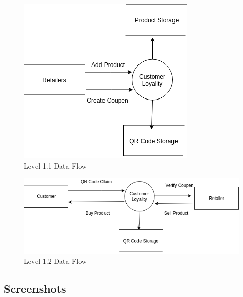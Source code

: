 \hspace{2.0mm}
\begin{figure}[H]
\includegraphics[scale=0.63]{level1_1}
\caption{Level 1.1 Data Flow}
\end{figure}
\vspace{2cm}
\begin{figure}[H]
\includegraphics[scale=0.63]{level1_2}
\caption{Level 1.2 Data Flow}
\end{figure}

\subsection{Screenshots}




